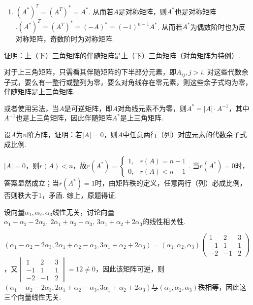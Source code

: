 \begin{exercise}
\begin{exgroup}
\begin{answer}
\begin{enumerate}
                \item $(A^*)^T=(A^T)^*=A^*$. 从而若$A$是对称矩阵，则$A^*$也是对称矩阵$. (A^*)^T=(A^T)^*=(-A)^*=(-1)^{n-1}A^*$. 从而若$A^*$为偶数阶时也为反对称矩阵，奇数阶时为对称矩阵.
            \end{enumerate}
        \end{answer}

        \item 证明：上（下）三角矩阵的伴随矩阵是上（下）三角矩阵（对角矩阵为特例）.
        \begin{answer}
            对于上三角矩阵，只需看其伴随矩阵的下半部分元素，即$A_{ij},j>i$. 对这些代数余子式，要么有一整行或整列为零，要么对角线存在零元素，则这些余子式均为零，伴随矩阵是上三角矩阵.\par 或者使用另法，当$A$是可逆矩阵，即$A$对角线元素不为零，则$A^*=|A|\cdot A^{-1}$，其中$A^{-1}$也是上三角矩阵，因此伴随矩阵$A^*$是上三角矩阵.
        \end{answer}

        \item 设$A$为$n$阶方阵，证明：若$|A|=0$，则$A$中任意两行（列）对应元素的代数余子式成比例.
        \begin{answer}
            $|A|=0$，则$r(A)<n$，故$r(A^*)=\begin{cases}
                1, & r(A)=n-1 \\
                0, & r(A)<n-1
            \end{cases}$. 当$r(A^*)=0$时，答案显然成立；当$r(A^*)=1$时，由矩阵秩的定义，任意两行（列）必成比例，否则秩大于1，矛盾. 综上，原题得证.
        \end{answer}

        \item 设向量$\alpha_1,\alpha_2,\alpha_3$线性无关，讨论向量$\alpha_1-\alpha_2-2\alpha_3,\ 2\alpha_1+\alpha_2-\alpha_3,\ 3\alpha_1+\alpha_2+2\alpha_3$的线性相关性.
        \begin{answer}
            $(\alpha_1-\alpha_2-2\alpha_3,2\alpha_1+\alpha_2-\alpha_3,3\alpha_1+\alpha_2+2\alpha_3)=(\alpha_1,\alpha_2,\alpha_3)\begin{pmatrix}
                1 & 2 & 3 \\ -1 & 1 & 1 \\ -2 & -1 & 2
            \end{pmatrix}$，又$\begin{vmatrix}
                1 & 2 & 3 \\ -1 & 1 & 1 \\ -2 & -1 & 2
            \end{vmatrix}=12\neq 0$，因此该矩阵可逆，则$(\alpha_1-\alpha_2-2\alpha_3,2\alpha_1+\alpha_2-\alpha_3,3\alpha_1+\alpha_2+2\alpha_3)$与$(\alpha_1,\alpha_2,\alpha_3)$秩相等，因此这三个向量线性无关.
        \end{answer}


\end{exgroup}
\end{exercise}
